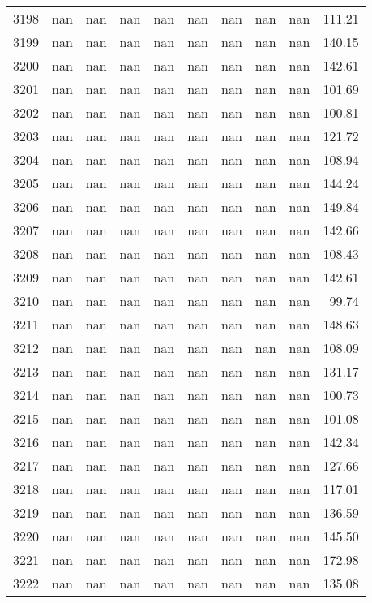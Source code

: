 \begin{tabular}{lrrrrrrrrr}
3198 & nan & nan & nan & nan & nan & nan & nan & nan & 111.21 \\
3199 & nan & nan & nan & nan & nan & nan & nan & nan & 140.15 \\
3200 & nan & nan & nan & nan & nan & nan & nan & nan & 142.61 \\
3201 & nan & nan & nan & nan & nan & nan & nan & nan & 101.69 \\
3202 & nan & nan & nan & nan & nan & nan & nan & nan & 100.81 \\
3203 & nan & nan & nan & nan & nan & nan & nan & nan & 121.72 \\
3204 & nan & nan & nan & nan & nan & nan & nan & nan & 108.94 \\
3205 & nan & nan & nan & nan & nan & nan & nan & nan & 144.24 \\
3206 & nan & nan & nan & nan & nan & nan & nan & nan & 149.84 \\
3207 & nan & nan & nan & nan & nan & nan & nan & nan & 142.66 \\
3208 & nan & nan & nan & nan & nan & nan & nan & nan & 108.43 \\
3209 & nan & nan & nan & nan & nan & nan & nan & nan & 142.61 \\
3210 & nan & nan & nan & nan & nan & nan & nan & nan & 99.74 \\
3211 & nan & nan & nan & nan & nan & nan & nan & nan & 148.63 \\
3212 & nan & nan & nan & nan & nan & nan & nan & nan & 108.09 \\
3213 & nan & nan & nan & nan & nan & nan & nan & nan & 131.17 \\
3214 & nan & nan & nan & nan & nan & nan & nan & nan & 100.73 \\
3215 & nan & nan & nan & nan & nan & nan & nan & nan & 101.08 \\
3216 & nan & nan & nan & nan & nan & nan & nan & nan & 142.34 \\
3217 & nan & nan & nan & nan & nan & nan & nan & nan & 127.66 \\
3218 & nan & nan & nan & nan & nan & nan & nan & nan & 117.01 \\
3219 & nan & nan & nan & nan & nan & nan & nan & nan & 136.59 \\
3220 & nan & nan & nan & nan & nan & nan & nan & nan & 145.50 \\
3221 & nan & nan & nan & nan & nan & nan & nan & nan & 172.98 \\
3222 & nan & nan & nan & nan & nan & nan & nan & nan & 135.08 \\

\end{tabular}
